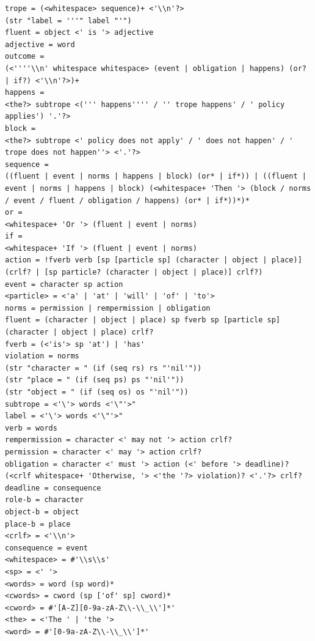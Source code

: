 \documentclass[11pt]{report}
\begin{document}
\begin{lstlisting}[showstringspaces=false,label={lst:ebnf2},caption={EBNF
grammar for the main trope definitions in TropICAL}]
trope = (<whitespace> sequence)+ <'\\n'?>
(str "label = '''" label "'")
fluent = object <' is '> adjective
adjective = word
outcome =
(<''''\\n' whitespace whitespace> (event | obligation | happens) (or? | if?) <'\\n'?>)+
happens =
<the?> subtrope <(''' happens'''' / '' trope happens' / ' policy applies') '.'?>
block =
<the?> subtrope <' policy does not apply' / ' does not happen' / ' trope does not happen''> <'.'?>
sequence =
((fluent | event | norms | happens | block) (or* | if*)) | ((fluent | event | norms | happens | block) (<whitespace+ 'Then '> (block / norms / event / fluent / obligation / happens) (or* | if*))*)*
or =
<whitespace+ 'Or '> (fluent | event | norms)
if =
<whitespace+ 'If '> (fluent | event | norms)
action = !fverb verb [sp [particle sp] (character | object | place)] (crlf? | [sp particle? (character | object | place)] crlf?)
event = character sp action
<particle> = <'a' | 'at' | 'will' | 'of' | 'to'>
norms = permission | rempermission | obligation
fluent = (character | object | place) sp fverb sp [particle sp] (character | object | place) crlf?
fverb = (<'is'> sp 'at') | 'has'
violation = norms
(str "character = " (if (seq rs) rs "'nil'"))
(str "place = " (if (seq ps) ps "'nil'"))
(str "object = " (if (seq os) os "'nil'"))
subtrope = <'\'> words <'\"'>"
label = <'\'> words <'\"'>"
verb = words
rempermission = character <' may not '> action crlf?
permission = character <' may '> action crlf?
obligation = character <' must '> action (<' before '> deadline)? (<crlf whitespace+ 'Otherwise, '> <'the '?> violation)? <'.'?> crlf?
deadline = consequence
role-b = character
object-b = object
place-b = place
<crlf> = <'\\n'>
consequence = event
<whitespace> = #'\\s\\s'
<sp> = <' '>
<words> = word (sp word)*
<cwords> = cword (sp ['of' sp] cword)*
<cword> = #'[A-Z][0-9a-zA-Z\\-\\_\\']*'
<the> = <'The ' | 'the '>
<word> = #'[0-9a-zA-Z\\-\\_\\']*'
\end{lstlisting}
\end{document}

